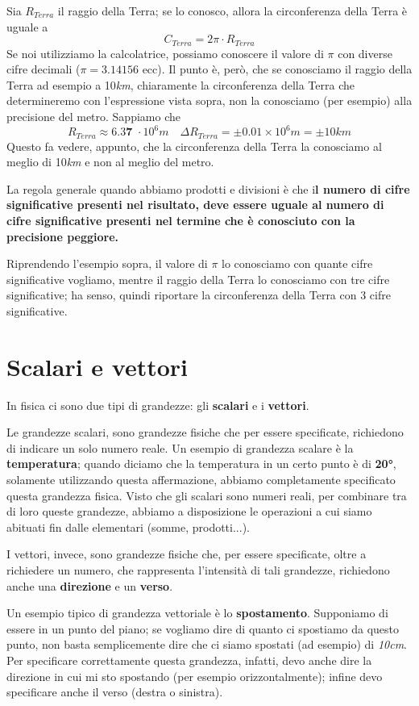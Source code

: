 \documentclass[a4paper]{book}
\begin{document}
Sia $ R_{Terra}$ il raggio della Terra; se lo conosco, allora la circonferenza della Terra è uguale a
$$ C_{Terra} = 2 \pi \cdot R_{Terra}$$
Se noi utilizziamo la calcolatrice, possiamo conoscere il valore di $\pi$ con diverse cifre decimali ($\pi = 3.14156$ ecc). Il punto è, però, che se conosciamo il raggio della Terra ad esempio a 10\textit{km}, chiaramente la circonferenza della Terra che determineremo con l'espressione vista sopra, non la conosciamo (per esempio) alla precisione del metro. Sappiamo che 
$$ R_{Terra} \approx 6.3\textbf{7 }\cdot 10^{6}m \quad  \Delta R_{Terra} = \pm 0.01 \times 10^{6} m = \pm 10km $$
Questo fa vedere, appunto, che la circonferenza della Terra la conosciamo al meglio di 10\textit{km} e non al meglio del metro.

La regola generale quando abbiamo prodotti e divisioni è che i\textbf{l numero di cifre significative presenti nel risultato, deve essere uguale al numero di cifre significative presenti nel termine che è conosciuto con la precisione peggiore.}

Riprendendo l'esempio sopra, il valore di $\pi$ lo conosciamo con quante cifre significative vogliamo, mentre il raggio della Terra lo conosciamo con tre cifre significative; ha senso,  quindi riportare la circonferenza della Terra con 3 cifre significative.


\section{Scalari e vettori}
In fisica ci sono due tipi di grandezze: gli \textbf{scalari} e i \textbf{vettori}.

Le grandezze scalari, sono grandezze fisiche che per essere specificate, richiedono di indicare un solo numero reale. Un esempio di grandezza scalare è la \textbf{temperatura}; quando diciamo che la temperatura in un certo punto è di\textbf{ 20°}, solamente utilizzando questa affermazione, abbiamo completamente specificato questa grandezza fisica. Visto che gli scalari sono numeri reali, per combinare tra di loro queste grandezze, abbiamo a disposizione le operazioni a cui siamo abituati fin dalle elementari (somme, prodotti...).

I vettori, invece, sono grandezze fisiche che, per essere specificate, oltre a richiedere un numero, che rappresenta l'intensità di tali grandezze, richiedono anche una \textbf{direzione} e un \textbf{verso}.

Un esempio tipico di grandezza vettoriale è lo \textbf{spostamento}. Supponiamo di essere in un punto del piano; se vogliamo dire di quanto ci spostiamo da questo punto, non basta semplicemente dire che ci siamo spostati (ad esempio) di \textit{10cm}. Per specificare correttamente questa grandezza, infatti, devo anche dire la direzione in cui mi sto spostando (per esempio orizzontalmente); infine devo specificare anche il verso (destra o sinistra). 
\end{document}
